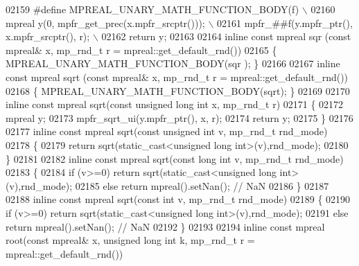 \begin{DoxyCode}
{{02159 \textcolor{comment}{}\textcolor{preprocessor}{#define MPREAL\_UNARY\_MATH\_FUNCTION\_BODY(f)                    \(\backslash\)}
02160 \textcolor{preprocessor}{        mpreal y(0, mpfr\_get\_prec(x.mpfr\_srcptr()));          \(\backslash\)}
02161 \textcolor{preprocessor}{        mpfr\_##f(y.mpfr\_ptr(), x.mpfr\_srcptr(), r);           \(\backslash\)}
02162 \textcolor{preprocessor}{        return y;}
02163 
02164 \textcolor{keyword}{inline} \textcolor{keyword}{const} mpreal sqr  (\textcolor{keyword}{const} mpreal& x, mp\_rnd\_t r = mpreal::get\_default\_rnd())
02165 \{   MPREAL\_UNARY\_MATH\_FUNCTION\_BODY(sqr );    \}
02166 
02167 \textcolor{keyword}{inline} \textcolor{keyword}{const} mpreal sqrt (\textcolor{keyword}{const} mpreal& x, mp\_rnd\_t r = mpreal::get\_default\_rnd())
02168 \{   MPREAL\_UNARY\_MATH\_FUNCTION\_BODY(sqrt);    \}
02169 
02170 \textcolor{keyword}{inline} \textcolor{keyword}{const} mpreal sqrt(\textcolor{keyword}{const} \textcolor{keywordtype}{unsigned} \textcolor{keywordtype}{long} \textcolor{keywordtype}{int} x, mp\_rnd\_t r)
02171 \{
02172     mpreal y;
02173     mpfr\_sqrt\_ui(y.mpfr\_ptr(), x, r);
02174     \textcolor{keywordflow}{return} y;
02175 \}
02176 
02177 \textcolor{keyword}{inline} \textcolor{keyword}{const} mpreal sqrt(\textcolor{keyword}{const} \textcolor{keywordtype}{unsigned} \textcolor{keywordtype}{int} v, mp\_rnd\_t rnd\_mode)
02178 \{
02179     \textcolor{keywordflow}{return} sqrt(static\_cast<unsigned long int>(v),rnd\_mode);
02180 \}
02181 
02182 \textcolor{keyword}{inline} \textcolor{keyword}{const} mpreal sqrt(\textcolor{keyword}{const} \textcolor{keywordtype}{long} \textcolor{keywordtype}{int} v, mp\_rnd\_t rnd\_mode)
02183 \{
02184     \textcolor{keywordflow}{if} (v>=0)   \textcolor{keywordflow}{return} sqrt(static\_cast<unsigned long int>(v),rnd\_mode);
02185     \textcolor{keywordflow}{else}        \textcolor{keywordflow}{return} mpreal().setNan(); \textcolor{comment}{// NaN}
02186 \}
02187 
02188 \textcolor{keyword}{inline} \textcolor{keyword}{const} mpreal sqrt(\textcolor{keyword}{const} \textcolor{keywordtype}{int} v, mp\_rnd\_t rnd\_mode)
02189 \{
02190     \textcolor{keywordflow}{if} (v>=0)   \textcolor{keywordflow}{return} sqrt(static\_cast<unsigned long int>(v),rnd\_mode);
02191     \textcolor{keywordflow}{else}        \textcolor{keywordflow}{return} mpreal().setNan(); \textcolor{comment}{// NaN}
02192 \}
02193 
02194 \textcolor{keyword}{inline} \textcolor{keyword}{const} mpreal root(\textcolor{keyword}{const} mpreal& x, \textcolor{keywordtype}{unsigned} \textcolor{keywordtype}{long} \textcolor{keywordtype}{int} k, mp\_rnd\_t r = mpreal::get\_default\_rnd())
}}
\end{DoxyCode}
